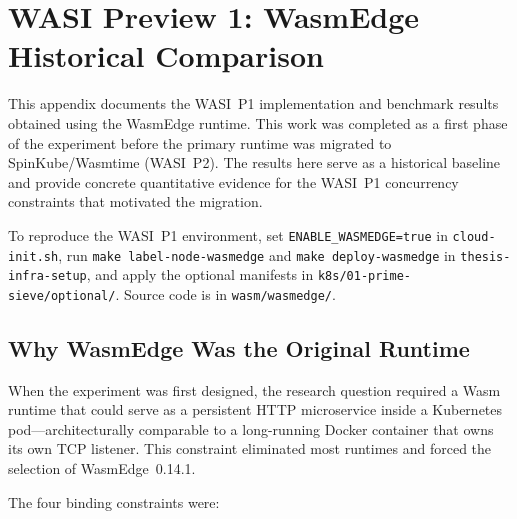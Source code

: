 \chapter{WASI Preview 1: WasmEdge Historical Comparison}
\label{app:wasmedge_p1}

This appendix documents the \acs{WASI}~P1 implementation and benchmark results obtained using the \acs{WasmEdge} runtime. This work was completed as a first phase of the experiment before the primary runtime was migrated to SpinKube/Wasmtime (\acs{WASI}~P2). The results here serve as a historical baseline and provide concrete quantitative evidence for the \acs{WASI}~P1 concurrency constraints that motivated the migration.

To reproduce the \acs{WASI}~P1 environment, set \texttt{ENABLE\_WASMEDGE=true} in \texttt{cloud-init.sh}, run \texttt{make label-node-wasmedge} and \texttt{make deploy-wasmedge} in \texttt{thesis-infra-setup}, and apply the optional manifests in \texttt{k8s/01-prime-sieve/optional/}. Source code is in \texttt{wasm/wasmedge/}.

\section{Why WasmEdge Was the Original Runtime}
\label{app:wasmedge_rationale}

When the experiment was first designed, the research question required a \acs{Wasm} runtime that could serve as a persistent \acs{HTTP} microservice inside a Kubernetes pod---architecturally comparable to a long-running Docker container that owns its own \acs{TCP} listener. This constraint eliminated most runtimes and forced the selection of \acs{WasmEdge}~0.14.1.

The four binding constraints were:

